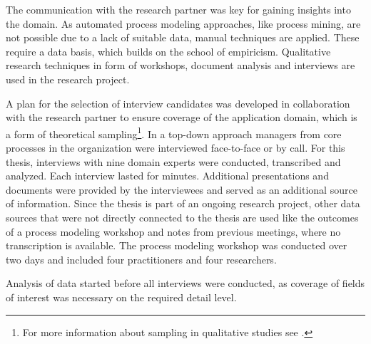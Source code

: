 	The communication with the research partner was key for gaining insights into the domain. As automated process modeling approaches, like process mining, are not possible due to a lack of suitable data, manual techniques are applied. These require a data basis, which builds on the school of empiricism. Qualitative research techniques in form of workshops, document analysis and interviews are used in the research project. 
	
	A plan for the selection of interview candidates was developed in collaboration with the research partner to ensure coverage of the application domain, which is a form of theoretical sampling\footnote{For more information about sampling in qualitative studies see \citep{coyne1997sampling}.}. In a top-down approach managers from core processes in the organization were interviewed face-to-face or by call. For this thesis, interviews with nine domain experts were conducted, transcribed and analyzed. Each interview lasted for  minutes. Additional presentations and documents were provided by the interviewees and served as an additional source of information. Since the thesis is part of an ongoing research project, other data sources that were not directly connected to the thesis are used like the outcomes of a process modeling workshop and notes from previous meetings, where no transcription is available. The process modeling workshop was conducted over two days and included four practitioners and four researchers. 
	
	Analysis of data started before all interviews were conducted, as coverage of fields of interest was necessary on the required detail level. 
	
	
	

